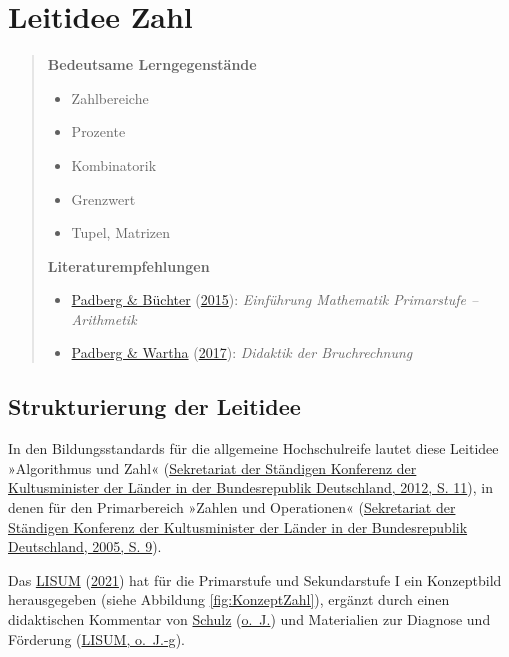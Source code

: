 \documentclass[
  ngerman,
]{scrbook}
\providecommand{\tightlist}{%
  \setlength{\itemsep}{0pt}\setlength{\parskip}{0pt}}
\theoremstyle{definition}
\theoremstyle{definition}
\theoremstyle{definition}
\theoremstyle{definition}
\theoremstyle{remark}
\begin{document}
\hypertarget{appendix-anhang}{%
\appendix}


\hypertarget{leitidee-zahl}{%
\chapter{Leitidee Zahl}\label{leitidee-zahl}}

\begin{quote}
\textbf{Bedeutsame Lerngegenstände}

\begin{itemize}
\tightlist
\item
  Zahlbereiche
\item
  Prozente
\item
  Kombinatorik
\item
  Grenzwert
\item
  Tupel, Matrizen
\end{itemize}

\textbf{Literaturempfehlungen}

\begin{itemize}
\tightlist
\item
  \protect\hyperlink{ref-Padberg2015}{Padberg \& Büchter} (\protect\hyperlink{ref-Padberg2015}{2015}): \emph{Einführung Mathematik Primarstufe -- Arithmetik}
\item
  \protect\hyperlink{ref-Padberg:2017}{Padberg \& Wartha} (\protect\hyperlink{ref-Padberg:2017}{2017}): \emph{Didaktik der Bruchrechnung}
\end{itemize}
\end{quote}

\hypertarget{strukturierung-der-leitidee-zahl}{%
\section{Strukturierung der Leitidee}\label{strukturierung-der-leitidee-zahl}}

In den Bildungsstandards für die allgemeine Hochschulreife lautet diese Leitidee »Algorithmus und Zahl« (\protect\hyperlink{ref-KMK:2012}{Sekretariat der Ständigen Konferenz der Kultusminister der Länder in der Bundesrepublik Deutschland, 2012, S. 11}), in denen für den Primarbereich »Zahlen und Operationen« (\protect\hyperlink{ref-KMK2005}{Sekretariat der Ständigen Konferenz der Kultusminister der Länder in der Bundesrepublik Deutschland, 2005, S. 9}).

Das \protect\hyperlink{ref-LISUM2021}{LISUM} (\protect\hyperlink{ref-LISUM2021}{2021}) hat für die Primarstufe und Sekundarstufe I ein Konzeptbild herausgegeben (siehe Abbildung \ref{fig:KonzeptZahl}), ergänzt durch einen didaktischen Kommentar von \protect\hyperlink{ref-Schulz}{Schulz} (\protect\hyperlink{ref-Schulz}{o.~J.}) und Materialien zur Diagnose und Förderung (\protect\hyperlink{ref-LISUMb}{LISUM, o.~J.-g}).
\end{document}
